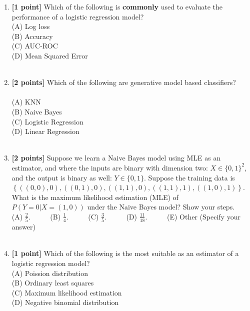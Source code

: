 \documentclass{article}
\newenvironment{soln}{
	\leavevmode\color{blue}\ignorespaces
}{}
\begin{document}
\begin{enumerate}
	
	\item \textbf{[1 point]} Which of the following is \textbf{commonly} used to evaluate the performance of a logistic regression model? \\
    (A) Log loss \\
    (B) Accuracy \\
    (C) AUC-ROC \\ 
    (D) Mean Squared Error \\
    \\
    \begin{soln}

    \end{soln}
	
	\item \textbf{[2 points]} Which of the following are generative model based classifiers?\\ \\
	(A) KNN \\
	(B) Naive Bayes\\
	(C) Logistic Regression\\
	(D) Linear Regression\\
	\\
	\begin{soln}

    \end{soln}

	\item \textbf{[2 points]} Suppose we learn a Naive Bayes model using MLE as an estimator, and where the inputs are binary with dimension two: $X\in \{0,1\}^2$, and the output is binary as well: $Y\in \{0,1\}$. Suppose the training data is $\left\{((0,0),0), ((0,1),0),((1,1),0),((1,1),1),((1,0),1)\right\}$. What is the maximum likelihood estimation (MLE) of $P(Y=0|X=(1,0))$ under the Naive Bayes model? Show your steps.\\
	(A) $\frac{2}{5}$. \ \ \ \ \  (B) $\frac{1}{4}$. \ \ \ \ \ (C) $\frac{3}{5}$. \ \ \ \ \ (D) $\frac{11}{18}$. \ \ \ \ \ (E) Other (Specify your answer) \\
	\\
	\begin{soln}

    \end{soln}
	
	\item \textbf{[1 point]} Which of the following is the most suitable as an estimator of a logistic regression model?\\
    (A) Poission distribution \\
    (B) Ordinary least squares \\
    (C) Maximum likelihood estimation \\
    (D) Negative binomial distribution \\ 
    \\
    \begin{soln}


\end{soln}
\end{enumerate}
\end{document}
